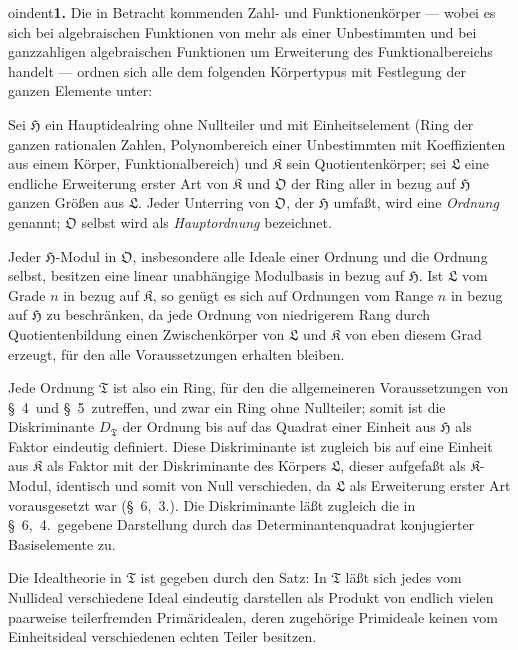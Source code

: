 \documentclass[12pt,a4paper]{article}
\newcommand{\HH}{\mathfrak{H}}          %
\newcommand{\TT}{\mathfrak{T}}          %
\theoremstyle{definition}
\begin{document}
oindent\textbf{1.} Die in Betracht kommenden Zahl- und Funktionenk\"orper
--- wobei es sich bei algebraischen Funktionen von mehr als einer
Unbestimmten und bei ganzzahligen algebraischen Funktionen um Erweiterung
des Funktionalbereichs handelt --- ordnen sich alle dem folgenden
K\"orpertypus mit Festlegung der ganzen Elemente unter:

Sei $\HH$ ein Hauptidealring ohne Nullteiler und mit Einheitselement (Ring
der ganzen rationalen Zahlen, Polynombereich einer Unbestimmten mit
Koeffizienten aus einem K\"orper, Funktionalbereich) und $\mathfrak{K}$ sein
Quotientenk\"orper; sei $\mathfrak{L}$ eine endliche Erweiterung erster Art
von $\mathfrak{K}$ und $\mathfrak{O}$ der Ring aller in bezug auf $\HH$
ganzen Gr\"o\ss en aus $\mathfrak{L}$. Jeder Unterring von $\mathfrak{O}$,
der $\HH$ umfa\ss t, wird eine \textit{Ordnung} genannt; $\mathfrak{O}$ selbst
wird als \textit{Hauptordnung} bezeichnet.

Jeder $\HH$-Modul in $\mathfrak{O}$, insbesondere alle Ideale einer Ordnung
und die Ordnung selbst, besitzen eine linear unabh\"angige Modulbasis in
bezug auf $\HH$. Ist $\mathfrak{L}$ vom Grade $n$ in bezug auf
$\mathfrak{K}$, so gen\"ugt es sich auf Ordnungen vom Range $n$ in bezug
auf $\HH$ zu beschr\"anken, da jede Ordnung von niedrigerem Rang durch
Quotientenbildung einen Zwischenk\"orper von $\mathfrak{L}$ und
$\mathfrak{K}$ von eben diesem Grad erzeugt, f\"ur den alle Voraussetzungen
erhalten bleiben.

Jede Ordnung $\TT$ ist also ein Ring, f\"ur den die allgemeineren
Voraussetzungen von \S~4\ und \S~5\ zutreffen, und zwar ein Ring ohne
Nullteiler; somit ist die Diskriminante $D_{\TT}$ der Ordnung bis auf das
Quadrat einer Einheit aus $\HH$ als Faktor eindeutig definiert. Diese
Diskriminante ist zugleich bis auf eine Einheit aus $\mathfrak{K}$ als
Faktor mit der Diskriminante des K\"orpers $\mathfrak{L}$, dieser
aufgefa\ss t als $\mathfrak{K}$-Modul, identisch und somit von Null
verschieden, da $\mathfrak{L}$ als Erweiterung erster Art vorausgesetzt war
(\S~6,~3.). Die Diskriminante l\"a\ss t zugleich die in \S~6,~4.\ gegebene
Darstellung durch das Determinantenquadrat konjugierter Basiselemente zu.

Die Idealtheorie in $\TT$ ist gegeben durch den Satz: In $\TT$ l\"a\ss t
sich jedes vom Nullideal verschiedene Ideal eindeutig darstellen als
Produkt von endlich vielen paarweise teilerfremden Prim\"aridealen, deren
zugeh\"orige Primideale keinen vom Einheitsideal verschiedenen echten Teiler
besitzen.
\end{document}
